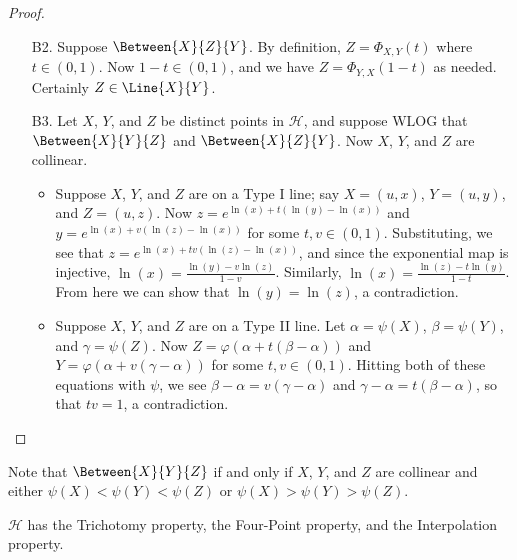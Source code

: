 \begin{proof}\mbox{}
\begin{itemize}
\item[B2.] Suppose \(\Between{X}{Z}{Y}\).
By definition, \(Z = \Phi_{X,Y}(t)\) where \(t \in (0,1)\).
Now \(1-t \in (0,1)\), and we have \(Z = \Phi_{Y,X}(1-t)\) as needed.
Certainly \(Z \in \Line{X}{Y}\).
\item[B3.] Let \(X\), \(Y\), and \(Z\) be distinct points in \(\mathcal{H}\), and suppose WLOG that \(\Between{X}{Y}{Z}\) and \(\Between{X}{Z}{Y}\).
Now \(X\), \(Y\), and \(Z\) are collinear.
\begin{itemize}
\item Suppose \(X\), \(Y\), and \(Z\) are on a Type I line; say \(X = (u,x)\), \(Y = (u,y)\), and \(Z = (u,z)\).
Now \(z = e^{\ln(x) + t(\ln(y) - \ln(x))}\) and \(y = e^{\ln(x) + v(\ln(z) - \ln(x))}\) for some \(t,v \in (0,1)\).
Substituting, we see that \(z = e^{\ln(x) + tv(\ln(z) - \ln(x))}\), and since the exponential map is injective, \(\ln(x) = \frac{\ln(y) - v\ln(z)}{1-v}\).
Similarly, \(\ln(x) = \frac{\ln(z) - t\ln(y)}{1-t}\).
From here we can show that \(\ln(y) = \ln(z)\), a contradiction.
\item Suppose \(X\), \(Y\), and \(Z\) are on a Type II line.
Let \(\alpha = \psi(X)\), \(\beta = \psi(Y)\), and \(\gamma = \psi(Z)\).
Now \(Z = \varphi(\alpha + t(\beta - \alpha))\) and \(Y = \varphi(\alpha + v(\gamma - \alpha))\) for some \(t,v \in (0,1)\).
Hitting both of these equations with \(\psi\), we see \(\beta - \alpha = v(\gamma - \alpha)\) and \(\gamma - \alpha = t(\beta - \alpha)\), so that \(tv = 1\), a contradiction.
\end{itemize}
\end{itemize}
\end{proof}

Note that \(\Between{X}{Y}{Z}\) if and only if \(X\), \(Y\), and \(Z\) are collinear and either \(\psi(X) < \psi(Y) < \psi(Z)\) or \(\psi(X) > \psi(Y) > \psi(Z)\).

\begin{prop}
\(\mathcal{H}\) has the Trichotomy property, the Four-Point property, and the Interpolation property.
\end{prop}


